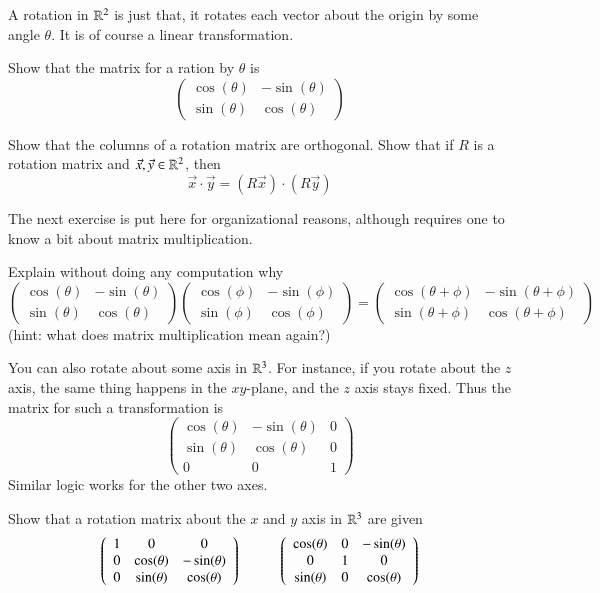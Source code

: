 A rotation in $\mathbb{R}^2$ is just that, it rotates each vector about the origin by some angle $\theta$.
It is of course a linear transformation.
\begin{Ex}
  Show that the matrix for a ration by $\theta$ is 
  \[\left(\begin{array}{cc} \cos(\theta) & -\sin(\theta) \\ \sin(\theta) & \cos(\theta)\end{array}\right)\]
\end{Ex}
\begin{Ex}
  Show that the columns of a rotation matrix are orthogonal.
  Show that if $R$ is a rotation matrix and $\vec{x},\vec{y}\in \mathbb{R}^2$, then
  \[\vec{x}\cdot\vec{y} = (R\vec{x})\cdot(R\vec{y})\]
\end{Ex}
The next exercise is put here for organizational reasons, although requires one to know a bit about matrix multiplication.
\begin{ImpEx}
  \label{sec:addingangles}
  Explain without doing any computation why
  \[\left(\begin{array}{cc} \cos(\theta) & -\sin(\theta) \\ \sin(\theta) & \cos(\theta)\end{array}\right)
  \left(\begin{array}{cc} \cos(\phi) & -\sin(\phi) \\ \sin(\phi) & \cos(\phi)\end{array}\right) = 
  \left(\begin{array}{cc} \cos(\theta+\phi) & -\sin(\theta+\phi) \\ \sin(\theta+\phi) & \cos(\theta+\phi)\end{array}\right)\]
  (hint: what does matrix multiplication mean again?)
\end{ImpEx}

You can also rotate about some axis in $\mathbb{R}^3$.
For instance, if you rotate about the $z$ axis, the same thing happens in the $xy$-plane, and the $z$ axis stays fixed.
Thus the matrix for such a transformation is
\[\left(\begin{array}{ccc}  \cos(\theta) & -\sin(\theta) & 0\\ \sin(\theta) & \cos(\theta) & 0 \\ 0 & 0 & 1 \end{array}\right)\]
Similar logic works for the other two axes.
\begin{Ex}
  Show that a rotation matrix about the $x$ and $y$ axis in $\mathbb{R}^3$ are given
  \[\left(\begin{array}{ccc}  1 & 0 & 0 \\ 0 & \cos(\theta) & -\sin(\theta)\\ 0 & \sin(\theta) & \cos(\theta) \end{array}\right)
  \hspace{10mm}
  \left(\begin{array}{ccc}  \cos(\theta) & 0 & -\sin(\theta)\\ 0 & 1 & 0 \\ \sin(\theta) &  0 & \cos(\theta) \end{array}\right)\]
\end{Ex}

